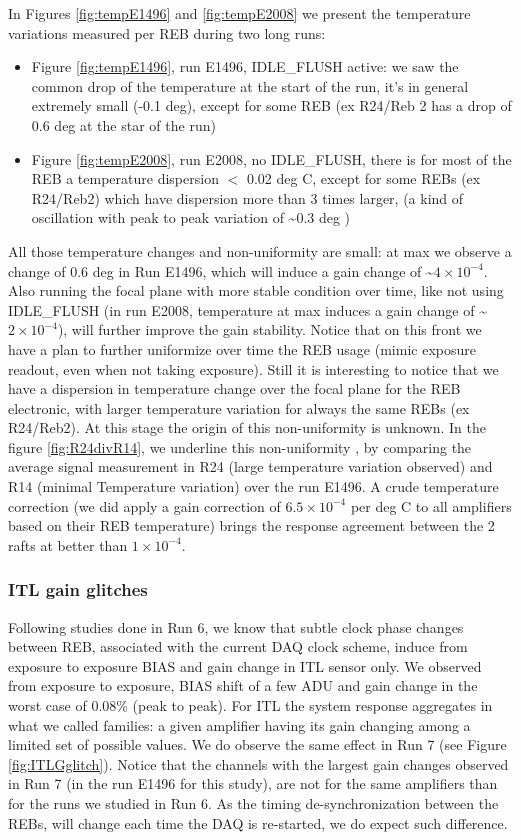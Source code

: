 In Figures \ref{fig:tempE1496} and \ref{fig:tempE2008} we present the temperature variations measured per REB during two long runs:  

\begin{itemize}
\item Figure \ref{fig:tempE1496}, run E1496, IDLE\_FLUSH active: we saw the common drop of the temperature at the start of the run, it’s in general extremely small (-0.1 deg), except for some REB (ex R24/Reb 2 has a drop of 0.6 deg at the star of the run) 
\item Figure \ref{fig:tempE2008}, run E2008, no IDLE\_FLUSH, there is for most of the REB a temperature dispersion $<$ 0.02 deg C, except for some REBs (ex R24/Reb2) which have dispersion more than 3 times larger, (a kind of oscillation with peak to peak variation of \textasciitilde 0.3 deg ) 
\end{itemize}

All those temperature changes and non-uniformity are small: at max we observe a change of 0.6 deg in Run E1496, which will induce a gain change of \textasciitilde $4\times 10^{-4}$. Also running the focal plane with more stable condition over time, like not using IDLE\_FLUSH (in run E2008, temperature at max induces a gain change of \textasciitilde$2\times 10^{-4}$), will further improve the gain stability. Notice that on this front we have a plan to further uniformize over time the REB usage (mimic exposure readout, even when not taking exposure). Still it is interesting to notice that we have a dispersion in temperature change  over the focal plane for the REB electronic, with larger temperature variation for always the same REBs (ex R24/Reb2). At this stage the origin of this  non-uniformity is unknown. 
In the figure \ref{fig:R24divR14}, we underline this non-uniformity , by comparing the average signal measurement in R24 (large temperature variation observed) and R14 (minimal Temperature variation) over the run E1496. A crude temperature correction (we did apply a gain correction of $6.5\times10^{-4}$ per deg C to all amplifiers based on their REB temperature)  brings the response agreement between the 2 rafts at better than $1\times10^{-4}$.  


\clearpage
\subsubsection{ITL gain glitches} 
Following studies done in Run 6, we know that subtle clock phase changes between REB, associated with the current DAQ clock scheme, induce from exposure to exposure BIAS and gain change in ITL sensor only.  We observed from exposure to exposure, BIAS shift of a few ADU and gain change in the worst case of 0.08\% (peak to peak). For ITL the system response aggregates in what we called families: a given amplifier having its gain changing among a limited set of possible values. We do observe the same effect in Run 7 (see Figure \ref{fig:ITLGglitch}). Notice that the channels with the largest gain changes observed in Run 7 (in the run E1496 for this study), are  not for the same amplifiers than for the runs we studied in Run 6. As the timing de-synchronization between the REBs, will change each time the DAQ is re-started, we do expect such difference.

